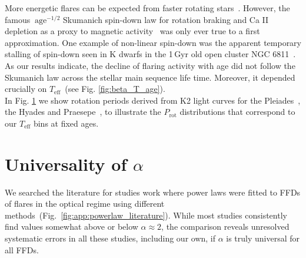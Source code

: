 \documentclass{aa}
\begin{document}
\begin{appendix}
\begin{figure}
          \label{fig:rotation_histogram}
   \end{figure}
More energetic flares can be expected from faster rotating stars~\citep{candelaresi_superflare_2014, doorsselaere_stellar_2017, yang_flaring_2017}. However, the famous $~\mathrm{age}^{-1/2}$ Skumanich spin-down law for rotation braking and Ca II depletion as a proxy to magnetic activity~\citep{skumanich1972} was only ever true to a first approximation.
One example of non-linear spin-down was the apparent temporary stalling of spin-down seen in K dwarfs in the 1\,Gyr old open cluster NGC 6811~\citep{curtis2019}. As our results indicate, the decline of flaring activity with age did not follow the Skumanich law across the stellar main sequence life time. Moreover, it depended crucially on $T_\mathrm{eff}$~(see Fig. \ref{fig:beta_T_age}). 
\\
In Fig. \ref{fig:rotation_histogram} we show rotation periods derived from K2 light curves for the Pleiades~\citep{rebull_pleiadesrot_2016}, the Hyades and Praesepe~\citep{douglas2019}, to illustrate the $P_\mathrm{rot}$ distributions that correspond to our $T_\mathrm{eff}$ bins at fixed ages.
\section{Universality of $\alpha$}
\label{sec:app:universal_alpha}
We searched the literature for studies work where power laws were fitted to FFDs of flares in the optical regime using different methods~(Fig.~\ref{fig:app:powerlaw_literature}). While most studies consistently find values somewhat above or below $\alpha\approx2$, the comparison reveals unresolved systematic errors in all these studies, including our own, if $\alpha$ is truly universal for all FFDs.


\end{appendix}
\end{document}
